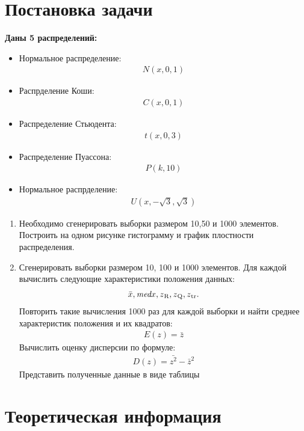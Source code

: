 \section{Постановка задачи}
\textbf{Даны 5 распределений:}
\begin{itemize}
\item Нормальное распределение: \begin{gather*}N(x,0,1)\end{gather*}
\item Распрделение Коши: \begin{gather*}C(x,0,1)\end{gather*}
\item Распределение Стьюдента:\begin{gather*}t(x,0,3)\end{gather*}
\item Распределение Пуассона: \begin{gather*}P(k,10)\end{gather*}
\item Нормальное распрделение: \begin{gather*}U(x,-\sqrt{3}, \sqrt{3})\end{gather*}
\end{itemize}
\begin{enumerate}
    \item Необходимо сгенерировать выборки размером 10,50 и 1000 элементов. Построить на одном рисунке гистограмму и график плостности распределения.
    \item Сгенерировать выборки размером 10, 100 и 1000 элементов. Для каждой вычислить следующие характеристики положения данных: \begin{gather*} \bar{x}, \textit{med}x, z\textsubscript{R}, z\textsubscript{Q}, z\textsubscript{tr}.\end{gather*} Повторить такие вычисления 1000 раз для каждой выборки и найти среднее характеристик положения и их квадратов:
    \begin{gather*}
 E(z) = \bar{z}
\end{gather*} 
    Вычислить оценку дисперсии по формуле:
    \begin{gather*}
    D(z) = \bar{z^{2}} - \bar{z}^{2}
\end{gather*} 
    Представить полученные данные в виде таблицы
\end{enumerate}


\section{Теоретическая информация}



